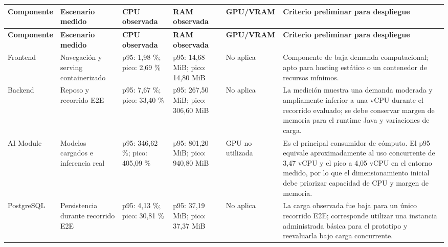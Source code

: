 {\scriptsize
\setlength{\LTleft}{0pt}
\setlength{\LTright}{0pt}
\setlength{\tabcolsep}{2pt}
\renewcommand{\arraystretch}{1.18}
\label{tab:arch-cloud-dimensionamiento}
\begin{longtable}{>{\raggedright\arraybackslash}p{} >{\raggedright\arraybackslash}p{} >{\raggedright\arraybackslash}p{} >{\raggedright\arraybackslash}p{} >{\raggedright\arraybackslash}p{} >{\raggedright\arraybackslash}p{}}
\hline
\textbf{Componente} & \textbf{Escenario medido} & \textbf{CPU observada} & \textbf{RAM observada} & \textbf{GPU/VRAM} & \textbf{Criterio preliminar para despliegue} \\
\hline
\endfirsthead
\hline
\textbf{Componente} & \textbf{Escenario medido} & \textbf{CPU observada} & \textbf{RAM observada} & \textbf{GPU/VRAM} & \textbf{Criterio preliminar para despliegue} \\
\hline
\endhead
\hline
\endfoot
Frontend & Navegación y serving containerizado & p95: 1,98 \%; pico: 2,69 \% & p95: 14,68 MiB; pico: 14,80 MiB & No aplica & Componente de baja demanda computacional; apto para hosting estático o un contenedor de recursos mínimos. \\
Backend & Reposo y recorrido E2E & p95: 7,67 \%; pico: 33,40 \% & p95: 267,50 MiB; pico: 306,60 MiB & No aplica & La medición muestra una demanda moderada y ampliamente inferior a una vCPU durante el recorrido evaluado; se debe conservar margen de memoria para el runtime Java y variaciones de carga. \\
AI Module & Modelos cargados e inferencia real & p95: 346,62 \%; pico: 405,09 \% & p95: 801,20 MiB; pico: 940,80 MiB & GPU no utilizada & Es el principal consumidor de cómputo. El p95 equivale aproximadamente al uso concurrente de 3,47 vCPU y el pico a 4,05 vCPU en el entorno medido, por lo que el dimensionamiento inicial debe priorizar capacidad de CPU y margen de memoria. \\
PostgreSQL & Persistencia durante recorrido E2E & p95: 4,13 \%; pico: 30,81 \% & p95: 37,19 MiB; pico: 37,37 MiB & No aplica & La carga observada fue baja para un único recorrido E2E; corresponde utilizar una instancia administrada básica para el prototipo y reevaluarla bajo carga concurrente. \\
\hline
\end{longtable}
}

